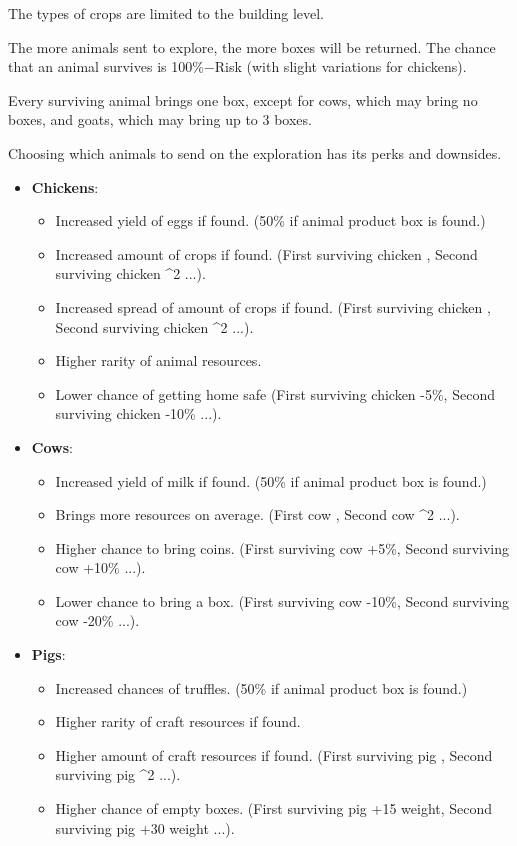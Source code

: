 \documentclass[12pt]{article}
\begin{document}
The types of crops are limited to the building level.

The more animals sent to explore, the more boxes will be returned. The chance that an animal survives is 100\%−Risk (with slight variations for chickens).

Every surviving animal brings one box, except for cows, which may bring no boxes, and goats, which may bring up to 3 boxes.

Choosing which animals to send on the exploration has its perks and downsides.


\begin{itemize}
    \item \textbf{Chickens}:
    \begin{itemize}
        \item Increased yield of eggs if found.
        (50\% if animal product box is found.)
        \item Increased amount of crops if found.
        (First surviving chicken , Second surviving chicken ^2 ...).
        \item Increased spread of amount of crops if found.
        (First surviving chicken , Second surviving chicken ^2 ...).
        \item Higher rarity of animal resources.
        \item Lower chance of getting home safe
        (First surviving chicken -5\%, Second surviving chicken -10\% ...).
    \end{itemize}
    \item \textbf{Cows}:
    \begin{itemize}
        \item Increased yield of milk if found.
        (50\% if animal product box is found.)
        \item Brings more resources on average.
        (First cow , Second cow ^2 ...).
        \item Higher chance to bring coins.
        (First surviving cow +5\%, Second surviving cow +10\% ...).
        \item Lower chance to bring a box.
        (First surviving cow -10\%, Second surviving cow -20\% ...).
    \end{itemize}

    \item \textbf{Pigs}:
    \begin{itemize}
        \item Increased chances of truffles.
        (50\% if animal product box is found.)
        \item Higher rarity of craft resources if found.
        \item Higher amount of craft resources if found.
        (First surviving pig , Second surviving pig ^2 ...).
        \item Higher chance of empty boxes.
        (First surviving pig +15 weight, Second surviving pig +30 weight ...).
    \end{itemize}


\end{itemize}
\end{document}
